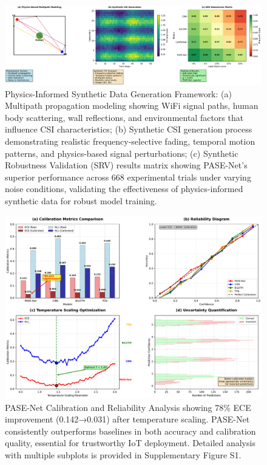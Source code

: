 \documentclass[journal]{IEEEtran}
\begin{document}
\begin{figure}[t]
\centering
\includegraphics[width=\columnwidth]{plots/fig2_physics_modeling_new.pdf}
\caption{Physics-Informed Synthetic Data Generation Framework: (a) Multipath propagation modeling showing WiFi signal paths, human body scattering, wall reflections, and environmental factors that influence CSI characteristics; (b) Synthetic CSI generation process demonstrating realistic frequency-selective fading, temporal motion patterns, and physics-based signal perturbations; (c) Synthetic Robustness Validation (SRV) results matrix showing PASE-Net's superior performance across 668 experimental trials under varying noise conditions, validating the effectiveness of physics-informed synthetic data for robust model training.}
\label{fig:physics_modeling}
\end{figure}

\begin{figure}[t]
\centering
\includegraphics[width=\columnwidth]{plots/fig3_calibration.pdf}
\caption{PASE-Net Calibration and Reliability Analysis showing 78\% ECE improvement (0.142→0.031) after temperature scaling. PASE-Net consistently outperforms baselines in both accuracy and calibration quality, essential for trustworthy IoT deployment. Detailed analysis with multiple subplots is provided in Supplementary Figure S1.}
\label{fig:calibration}
\end{figure}
\end{document}
